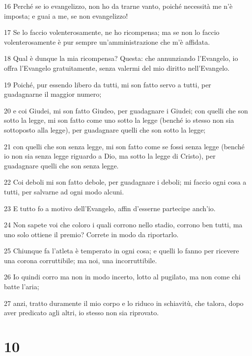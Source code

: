 \par 16 Perché se io evangelizzo, non ho da trarne vanto, poiché necessità me n'è imposta; e guai a me, se non evangelizzo!
\par 17 Se lo faccio volenterosamente, ne ho ricompensa; ma se non lo faccio volenterosamente è pur sempre un'amministrazione che m'è affidata.
\par 18 Qual è dunque la mia ricompensa? Questa: che annunziando l'Evangelo, io offra l'Evangelo gratuitamente, senza valermi del mio diritto nell'Evangelo.
\par 19 Poiché, pur essendo libero da tutti, mi son fatto servo a tutti, per guadagnarne il maggior numero;
\par 20 e coi Giudei, mi son fatto Giudeo, per guadagnare i Giudei; con quelli che son sotto la legge, mi son fatto come uno sotto la legge (benché io stesso non sia sottoposto alla legge), per guadagnare quelli che son sotto la legge;
\par 21 con quelli che son senza legge, mi son fatto come se fossi senza legge (benché io non sia senza legge riguardo a Dio, ma sotto la legge di Cristo), per guadagnare quelli che son senza legge.
\par 22 Coi deboli mi son fatto debole, per guadagnare i deboli; mi faccio ogni cosa a tutti, per salvarne ad ogni modo alcuni.
\par 23 E tutto fo a motivo dell'Evangelo, affin d'esserne partecipe anch'io.
\par 24 Non sapete voi che coloro i quali corrono nello stadio, corrono ben tutti, ma uno solo ottiene il premio? Correte in modo da riportarlo.
\par 25 Chiunque fa l'atleta è temperato in ogni cosa; e quelli lo fanno per ricevere una corona corruttibile; ma noi, una incorruttibile.
\par 26 Io quindi corro ma non in modo incerto, lotto al pugilato, ma non come chi batte l'aria;
\par 27 anzi, tratto duramente il mio corpo e lo riduco in schiavitù, che talora, dopo aver predicato agli altri, io stesso non sia riprovato.

\chapter{10}

